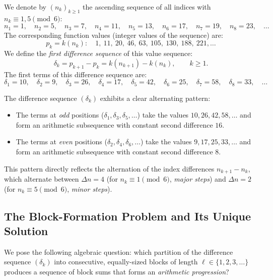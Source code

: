 We denote by $(n_k)_{k \geq 1}$ the ascending sequence of all
indices with $n_k \equiv 1, 5 \pmod{6}$:
\[
  n_1 = 1,\quad n_2 = 5,\quad n_3 = 7,\quad n_4 = 11,\quad
  n_5 = 13,\quad n_6 = 17,\quad n_7 = 19,\quad n_8 = 23,\quad \ldots
\]
The corresponding function values (integer values of the sequence) are:
\[
  p_k = k(n_k)\colon\quad 1,\ 11,\ 20,\ 46,\ 63,\ 105,\ 130,\ 188,\ 221,\ldots
\]
We define the \emph{first difference sequence} of this value sequence:
\[
  \delta_k = p_{k+1} - p_k = k(n_{k+1}) - k(n_k),\qquad k \geq 1.
\]
The first terms of this difference sequence are:
\[
  \delta_1 = 10,\quad \delta_2 = 9,\quad \delta_3 = 26,\quad
  \delta_4 = 17,\quad \delta_5 = 42,\quad \delta_6 = 25,\quad
  \delta_7 = 58,\quad \delta_8 = 33,\quad \ldots
\]

\begin{remark}
The difference sequence $(\delta_k)$ exhibits a clear alternating pattern:
\begin{itemize}
  \item The terms at \emph{odd} positions ($\delta_1, \delta_3, \delta_5, \ldots$)
        take the values $10, 26, 42, 58, \ldots$ and form an arithmetic subsequence
        with constant second difference $16$.
  \item The terms at \emph{even} positions ($\delta_2, \delta_4, \delta_6, \ldots$)
        take the values $9, 17, 25, 33, \ldots$ and form an arithmetic subsequence
        with constant second difference $8$.
\end{itemize}
This pattern directly reflects the alternation of the index differences
$n_{k+1} - n_k$, which alternate between $\Delta n = 4$ (for
$n_k \equiv 1 \pmod{6}$, \emph{major steps}) and $\Delta n = 2$ (for
$n_k \equiv 5 \pmod{6}$, \emph{minor steps}).
\end{remark}

\subsection{The Block-Formation Problem and Its Unique Solution}
\label{subsec:gruppenbildung}

We pose the following algebraic question: which partition of the
difference sequence $(\delta_k)$ into consecutive, equally-sized blocks
of length $\ell \in \{1, 2, 3, \ldots\}$ produces a sequence of block
sums that forms an \emph{arithmetic progression}?


